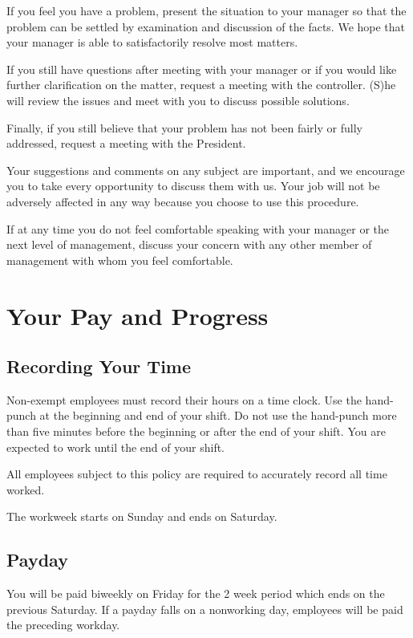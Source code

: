 \documentclass{book}
\begin{document}
If you feel you have a problem, present the situation to your manager so that the problem can be settled by examination and discussion of the facts. We hope that your manager is able to satisfactorily resolve most matters.

If you still have questions after meeting with your manager or if you would like further clarification on the matter, request a meeting with the controller. (S)he will review the issues and meet with you to discuss possible solutions.

Finally, if you still believe that your problem has not been fairly or fully addressed, request a meeting with the President.

Your suggestions and comments on any subject are important, and we encourage you to take every opportunity to discuss them with us. Your job will not be adversely affected in any way because you choose to use this procedure.

If at any time you do not feel comfortable speaking with your manager or the next level of management, discuss your concern with any other member of management with whom you feel comfortable.

\section{Your Pay and Progress}

\subsection{Recording Your Time}

Non-exempt employees must record their hours on a time clock. Use the hand-punch at the beginning and end of your shift. Do not use the hand-punch more than five minutes before the beginning or after the end of your shift. You are expected to work until the end of your shift. 

All employees subject to this policy are required to accurately record all time worked.

The workweek starts on Sunday and ends on Saturday.

\subsection{Payday}

You will be paid biweekly on Friday for the 2 week period which ends on the previous Saturday. If a payday falls on a nonworking day, employees will be paid the preceding workday.
\end{document}
